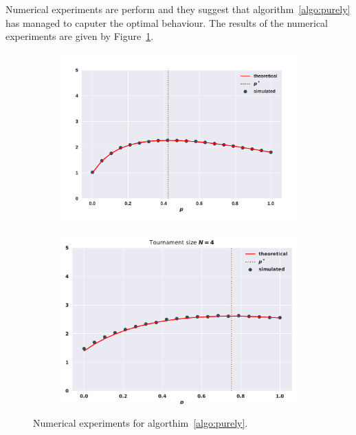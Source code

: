 \documentclass[10pt]{article}
\begin{document}
Numerical experiments are perform and they suggest that algorithm~\ref{algo:purely}
has managed to caputer the optimal behaviour. The results of the numerical experiments
are given by Figure~\ref{fig:purely_random_results}.

\begin{figure}
    \centering
    \begin{subfigure}{0.45\textwidth}
        \centering
        \includegraphics[width=.95\textwidth]{img/match_random}
    \end{subfigure}
    \begin{subfigure}{0.45\textwidth}
        \centering
        \includegraphics[width=.85\textwidth]{img/tournament_random}
    \end{subfigure}
    \caption{Numerical experiments for algorthim~\ref{algo:purely}.}
    \label{fig:purely_random_results}
\end{figure}
\end{document}
